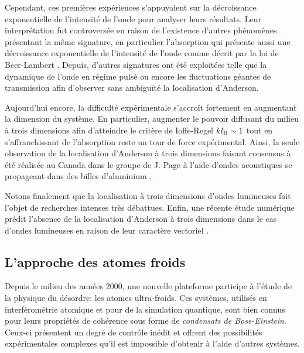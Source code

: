 Cependant, ces premières expériences s'appuyaient sur la décroissance exponentielle de l'intensité de l'onde pour analyser leurs résultats. Leur interprétation fut controversée en raison de l'existence d'autres phénomènes présentant la même signature, en particulier l'absorption qui présente aussi une décroissance exponentielle de l'intensité de l'onde comme décrit par la loi de Beer-Lambert \citep{scheffold1999localization}. Depuis, d'autres signatures ont été exploitées telle que la dynamique de l'onde en régime pulsé \citep{weaver1993anomalous} ou encore les fluctuations géantes de transmission \citep{nieuwenhuizen1995intensity} afin d'observer sans ambiguïté la localisation d'Anderson.

Aujourd'hui encore, la difficulté expérimentale s'accroît fortement en augmentant la dimension du système. En particulier, augmenter le pouvoir diffusant du milieu à trois dimensions afin d'atteindre le critère de Ioffe-Regel $k l_{\mathrm{B}} \sim 1$ tout en s'affranchissant de l'absorption reste un tour de force expérimental. Ainsi, la seule observation de la localisation d'Anderson à trois dimensions faisant consensus à été réalisée au Canada dans le groupe de J. Page à l'aide d'ondes acoustiques se propageant dans des billes d'aluminium \citep{hu2008localization}.

Notons finalement que la localisation à trois dimensions d'ondes lumineuses fait l'objet de recherches intenses très débattues. Enfin, une récente étude numérique prédit l'absence de la localisation d'Anderson à trois dimensions dans le cas d'ondes lumineuses en raison de leur caractère vectoriel \citep{skipetrov2014absence}.












\subsection{L'approche des atomes froids}
\label{sc:localisation_atomes_froids}
Depuis le milieu des années 2000, une nouvelle plateforme participe à l'étude de la physique du désordre: les atomes ultra-froids. Ces systèmes, utilisés en interférométrie atomique et pour de la simulation quantique, sont bien connus pour leurs propriétés de cohérence sous forme de \emph{condensats de Bose-Einstein}. Ceux-ci présentent un degré de contrôle inédit et offrent des possibilités expérimentales complexes qu'il est impossible d'obtenir à l'aide d'autres systèmes.

